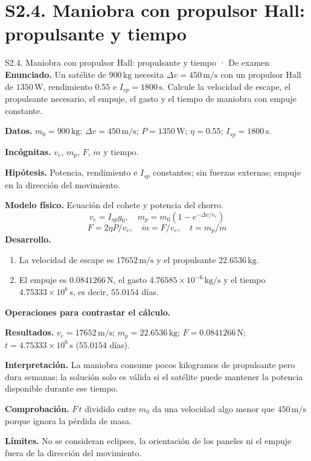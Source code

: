 \section{S2.4. Maniobra con propulsor Hall: propulsante y tiempo}
\begin{studiumworked}{S2.4. Maniobra con propulsor Hall: propulsante y tiempo · De examen}
\textbf{Enunciado.} Un satélite de $900\,\mathrm{kg}$ necesita $\Delta v=450\,\mathrm{m/s}$ con un propulsor Hall de $1350\,\mathrm W$, rendimiento $0.55$ e $I_{sp}=1800\,\mathrm s$. Calcule la velocidad de escape, el propulsante necesario, el empuje, el gasto y el tiempo de maniobra con empuje constante.

\textbf{Datos.} $m_0=900\,\mathrm{kg}$; $\Delta v=450\,\mathrm{m/s}$; $P=1350\,\mathrm W$; $\eta=0.55$; $I_{sp}=1800\,\mathrm s$.

\textbf{Incógnitas.} $v_e$, $m_p$, $F$, $\dot m$ y tiempo.

\textbf{Hipótesis.} Potencia, rendimiento e $I_{sp}$ constantes; sin fuerzas externas; empuje en la dirección del movimiento.

\textbf{Modelo físico.} Ecuación del cohete y potencia del chorro.
\[v_e=I_{sp}g_0,\quad m_p=m_0(1-e^{-\Delta v/v_e})\]
\[F=2\eta P/v_e,\quad \dot m=F/v_e,\quad t=m_p/\dot m\]
\textbf{Desarrollo.}
\begin{enumerate}
\item La velocidad de escape es $17652\,\mathrm{m/s}$ y el propulsante $22.6536\,\mathrm{kg}$.
\item El empuje es $0.0841266\,\mathrm N$, el gasto $4.76585\times10^{-6}\,\mathrm{kg/s}$ y el tiempo $4.75333\times10^{6}\,\mathrm s$, es decir, $55.0154$ días.
\end{enumerate}
\textbf{Operaciones para contrastar el cálculo.}

\textbf{Resultados.} $v_e=17652\,\mathrm{m/s}$; $m_p=22.6536\,\mathrm{kg}$; $F=0.0841266\,\mathrm N$; $t=4.75333\times10^{6}\,\mathrm s$ ($55.0154$ días).

\textbf{Interpretación.} La maniobra consume pocos kilogramos de propulsante pero dura semanas; la solución solo es válida si el satélite puede mantener la potencia disponible durante ese tiempo.

\textbf{Comprobación.} $F\,t$ dividido entre $m_0$ da una velocidad algo menor que $450\,\mathrm{m/s}$ porque ignora la pérdida de masa.

\textbf{Límites.} No se consideran eclipses, la orientación de los paneles ni el empuje fuera de la dirección del movimiento.
\end{studiumworked}
